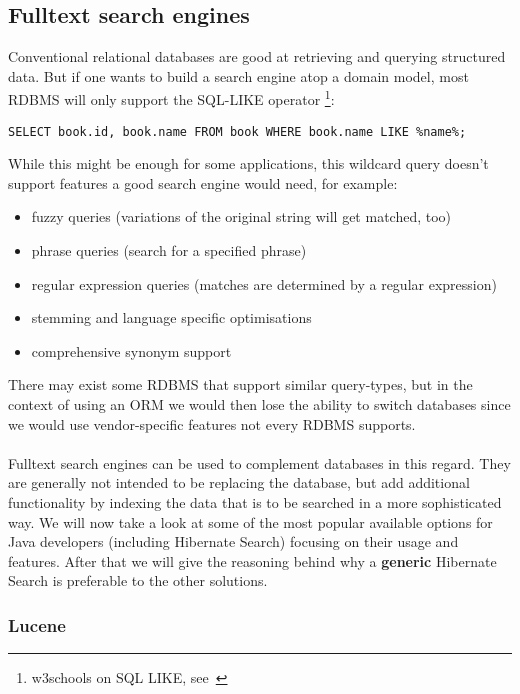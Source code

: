 \subsection{Fulltext search engines}

Conventional relational databases are good at retrieving and querying structured data. But if one wants to build a search engine atop a domain model, most RDBMS will only support the SQL-LIKE operator \footnote{w3schools on SQL LIKE, see~\cite{sql_like_w3schools}}:\\

\lstset{language=sql}
\begin{lstlisting}[frame=htrbl, caption={SQL LIKE operator in use}, label={lst:result2}]
SELECT book.id, book.name FROM book WHERE book.name LIKE %name%;
\end{lstlisting}
While this might be enough for some applications, this wildcard query doesn't support features a good search engine would need, for example:

\begin{itemize}
	\item fuzzy queries (variations of the original string will get matched, too)
	\item phrase queries (search for a specified phrase)
	\item regular expression queries (matches are determined by a regular expression)
	\item stemming and language specific optimisations
	\item comprehensive synonym support
\end{itemize}
There may exist some RDBMS that support similar query-types, but in the context of using an ORM we would then lose the ability to switch databases since we would use vendor-specific features not every RDBMS supports.
\\\\
Fulltext search engines can be used to complement databases in this regard. They are generally not intended to be replacing the database, but add additional functionality by indexing the data that is to be searched in a more sophisticated way. We will now take a look at some of the most popular available options for Java developers (including Hibernate Search) focusing on their usage and features. After that we will give the reasoning behind why a \textbf{generic} Hibernate Search is preferable to the other solutions.

\pagebreak

\subsubsection{Lucene}

